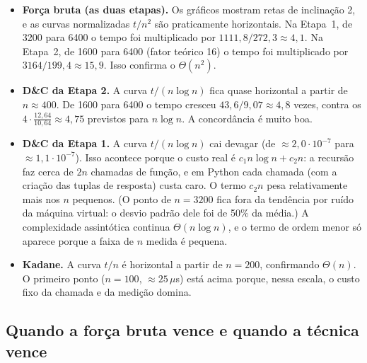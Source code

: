 \documentclass[11pt,a4paper]{article}
\begin{document}
\begin{itemize}
  \item \textbf{Força bruta (as duas etapas).} Os gráficos mostram retas de inclinação 2, e as curvas normalizadas $t/n^2$ são praticamente horizontais. Na Etapa~1, de 3200 para 6400 o tempo foi multiplicado por $1111{,}8/272{,}3\approx4{,}1$. Na Etapa~2, de 1600 para 6400 (fator teórico 16) o tempo foi multiplicado por $3164/199{,}4\approx15{,}9$. Isso confirma o $\Theta(n^2)$.
  \item \textbf{D\&C da Etapa 2.} A curva $t/(n\log n)$ fica quase horizontal a partir de $n\approx400$. De 1600 para 6400 o tempo cresceu $43{,}6/9{,}07\approx4{,}8$ vezes, contra os $4\cdot\frac{12{,}64}{10{,}64}\approx4{,}75$ previstos para $n\log n$. A concordância é muito boa.
  \item \textbf{D\&C da Etapa 1.} A curva $t/(n\log n)$ cai devagar (de $\approx2{,}0\cdot10^{-7}$ para $\approx1{,}1\cdot10^{-7}$). Isso acontece porque o custo real é $c_1 n\log n + c_2 n$: a recursão faz cerca de $2n$ chamadas de função, e em Python cada chamada (com a criação das tuplas de resposta) custa caro. O termo $c_2 n$ pesa relativamente mais nos $n$ pequenos. (O ponto de $n=3200$ fica fora da tendência por ruído da máquina virtual: o desvio padrão dele foi de 50\% da média.) A complexidade assintótica continua $\Theta(n\log n)$, e o termo de ordem menor só aparece porque a faixa de $n$ medida é pequena.
  \item \textbf{Kadane.} A curva $t/n$ é horizontal a partir de $n=200$, confirmando $\Theta(n)$. O primeiro ponto ($n=100$, $\approx25\,\mu$s) está acima porque, nessa escala, o custo fixo da chamada e da medição domina.
\end{itemize}

\subsection{Quando a força bruta vence e quando a técnica vence}

\begin{table}[H]\centering\small
\\[6pt]

\caption{Entradas pequenas, em microssegundos. Em cima, a Etapa 1; embaixo, a Etapa 2 (D\&C ``pura'', com limiar 3).}\label{tab:peq}
\end{table}
\end{document}
